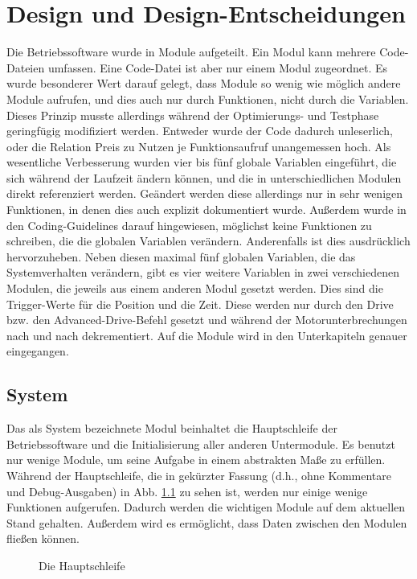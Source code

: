 \chapter{Design und Design-Entscheidungen}
Die Betriebssoftware wurde in Module aufgeteilt. Ein Modul kann mehrere Code-Dateien
umfassen. Eine Code-Datei ist aber nur einem Modul zugeordnet.
Es wurde besonderer Wert darauf gelegt, dass Module so wenig wie möglich andere
Module aufrufen, und dies auch nur durch Funktionen, nicht durch die Variablen.
Dieses Prinzip musste allerdings während der Optimierungs- und Testphase
geringfügig modifiziert werden. Entweder wurde der Code dadurch unleserlich, oder
die Relation Preis zu Nutzen je Funktionsaufruf unangemessen hoch.
Als wesentliche Verbesserung wurden vier bis fünf globale Variablen eingeführt, die
sich während der Laufzeit ändern können, und die in unterschiedlichen Modulen direkt
referenziert werden.
Geändert werden diese allerdings nur in sehr wenigen Funktionen, in denen dies
auch explizit dokumentiert wurde. Außerdem wurde in den Coding-Guidelines darauf hingewiesen,
möglichst keine Funktionen zu schreiben, die die globalen Variablen verändern.
Anderenfalls ist dies ausdrücklich hervorzuheben.
Neben diesen maximal fünf globalen Variablen, die das Systemverhalten verändern, gibt es vier
weitere Variablen in zwei verschiedenen Modulen, die jeweils aus einem anderen
Modul gesetzt werden. Dies sind die Trigger-Werte für die Position und
die Zeit. Diese werden nur durch den Drive bzw. den Advanced-Drive-Befehl
gesetzt und während der Motorunterbrechungen nach und nach dekrementiert.
Auf die Module wird in den Unterkapiteln genauer eingegangen.
\section{System}
Das als System bezeichnete Modul beinhaltet die Hauptschleife der Betriebssoftware
und die Initialisierung aller anderen Untermodule. Es benutzt nur wenige Module,
um seine Aufgabe in einem abstrakten Maße zu erfüllen. Während der Hauptschleife, die
in gekürzter Fassung (d.h., ohne Kommentare und Debug-Ausgaben) in Abb. \ref{main_loop} zu sehen ist,
werden nur einige wenige Funktionen aufgerufen. Dadurch werden die wichtigen Module auf dem
aktuellen Stand gehalten. Außerdem wird es ermöglicht, dass Daten zwischen den Modulen fließen können.
\begin{figure}[htb]
 \centering
 \caption{\label{main_loop}Die Hauptschleife}
\end{figure}
